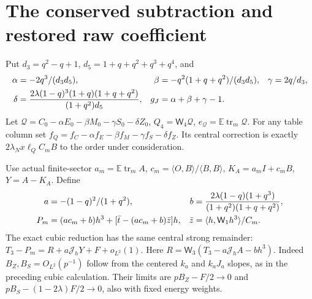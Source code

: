 \documentclass[11pt,a4paper]{article}
\newcommand{\EE}{\mathbb E}
\newcommand{\tr}{\operatorname{tr}}
\newcommand{\W}[1]{\mathsf W_{#1}}
\newcommand{\Jh}{\mathcal J_h}
\begin{document}
\newpage
\section{The conserved subtraction and restored raw coefficient}
Put $d_3=q^2-q+1$, $d_5=1+q+q^2+q^3+q^4$, and
\begin{align}
 \alpha&=-2q^3/(d_3d_5),&\beta&=-q^2(1+q+q^2)/(d_3d_5),&
 \gamma&=2q/d_3,\notag\\
 \delta&=\frac{2\lambda(1-q)^3(1+q)(1+q+q^2)}{(1+q^2)d_5},&
 g_J&=\alpha+\beta+\gamma-1.&
\end{align}
Let $\mathcal Q=C_0-\alpha E_0-\beta M_0-\gamma S_0-\delta Z_0$,
$Q_4=\W4\mathcal Q$, $e_{\mathcal Q}=\EE\tr_m\mathcal Q$.
For any table column set $f_Q=f_C-\alpha f_E-\beta f_M-
\gamma f_S-\delta f_Z$. Its central correction is exactly
$2\lambda_Nx\ell_Q C_mB$ to the order under consideration.

Use actual finite-sector $a_m=\EE\tr_m A$,
$c_m=\langle O,B\rangle/\langle B,B\rangle$,
$K_A=a_m I+c_mB$, $Y=A-K_A$. Define
\begin{align}
 a&=-(1-q)^2/(1+q^2),&
 b&=\frac{2\lambda(1-q)(1+q^3)}{(1+q^2)(1+q+q^2)},\notag\\
 P_m&=(ac_m+b)h^3+[\bar t-(ac_m+b)\bar z]h,
 &\bar z&=\langle h,\W1h^3\rangle/C_m.
\end{align}
The exact cubic reduction has the same central strong remainder:
$T_3-P_m=R+a\Jh Y+F+o_{L^2}(1)$.
Here $R=\W3(T_3-a\Jh A-bh^3)$.
Indeed $B_Z,B_S=O_{L^2}(p^{-1})$ follow from the centered
$k_a$ and $k_aJ_a$ slopes, as in the preceding cubic calculation.
Their limits are $pB_Z-F/2\to0$ and
$pB_S-(1-2\lambda)F/2\to0$, also with fixed energy weights.
\end{document}
